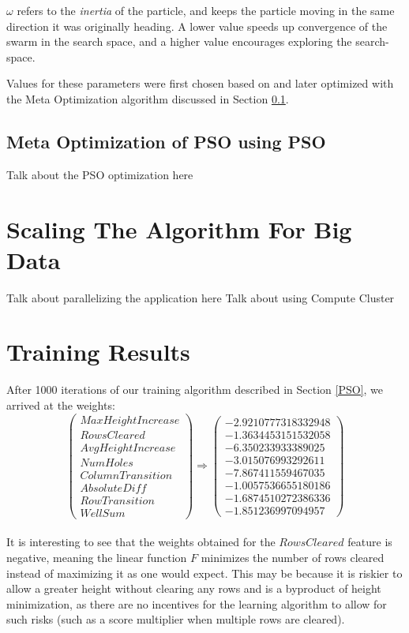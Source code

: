 \documentclass[12pt]{article}
\numberwithin{table}{section}
\begin{document}
$\omega$ refers to the \emph{inertia} of the particle, and keeps the particle moving in the same direction it was originally heading. A lower value speeds up convergence of the swarm in the search space, and a higher value encourages exploring the search-space.

Values for these parameters were first chosen based on \cite{1} and later optimized with the Meta Optimization algorithm discussed in Section \ref{meta-opt}.

\subsection{Meta Optimization of PSO using PSO}\label{meta-opt}
Talk about the PSO optimization here

\section{Scaling The Algorithm For Big Data}
Talk about parallelizing the application here
Talk about using Compute Cluster

\section{Training Results}\label{weights}
After 1000 iterations of our training algorithm described in Section \ref{PSO}, we arrived at the weights:
$$
\left( \begin{array}{c} 
MaxHeightIncrease
\\RowsCleared
\\AvgHeightIncrease
\\NumHoles
\\ColumnTransition
\\AbsoluteDiff
\\RowTransition
\\WellSum
\end{array} \right)
\Longrightarrow\left( \begin{array}{c}
-2.9210777318332948
\\-1.3634453151532058
\\-6.350233933389025
\\-3.015076993292611
\\-7.867411559467035
\\-1.0057536655180186
\\-1.6874510272386336
\\-1.851236997094957
\end{array} \right)
$$
\\
It is interesting to see that the weights obtained for the $RowsCleared$ feature is negative, meaning the linear function $F$ minimizes the number of rows cleared instead of maximizing it as one would expect. This may be because it is riskier to allow a greater height without clearing any rows and is a byproduct of height minimization, as there are no incentives for the learning algorithm to allow for such risks (such as a score multiplier when multiple rows are cleared). 
\end{document}
